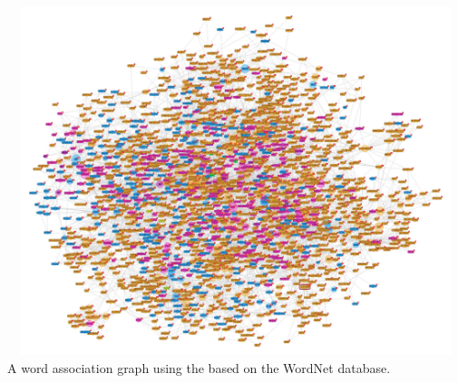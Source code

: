 \includegraphics[width=6in,height=4in]{wordassociation.jpg}
A word association graph using the based on the WordNet database.


